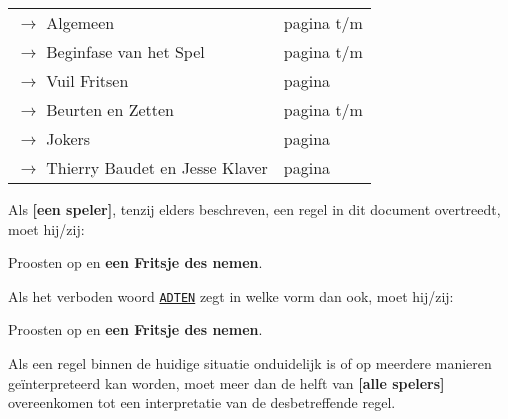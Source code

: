 \newpage
\drawBar{}


\begin{tabular}{ll}
    \large{$\rightarrow$ Algemeen} & \hspace{0.5cm} \large{pagina \pageref{sec:algemeen_start} t/m \pageref{sec:algemeen_einde}} \\
    \large{$\rightarrow$ Beginfase} van het Spel & \hspace{0.5cm} \large{pagina \pageref{sec:beginfase_start} t/m \pageref{sec:beginfase_einde}}\\
    \large{$\rightarrow$ Vuil Fritsen} & \hspace{0.5cm} \large{pagina \pageref{sec:vuil_fritsen}}\\
    \large{$\rightarrow$ Beurten en Zetten} & \hspace{0.5cm} \large{pagina \pageref{sec:beurten_en_zetten_start} t/m \pageref{sec:beurten_en_zetten_einde}} \\
    \large{$\rightarrow$ Jokers} & \hspace{0.5cm} \large{pagina \pageref{sec:jokers}}\\
    \large{$\rightarrow$ Thierry Baudet en Jesse Klaver} & \hspace{0.5cm} \large{pagina \pageref{sec:thierry}}
\end{tabular}

\label{sec:algemeen_start}
    \item Als \textbf{[een speler]}, tenzij elders beschreven, een regel in dit document overtreedt, moet hij/zij:
    \puntLijst{}
        \item Proosten op  en \textbf{een Fritsje des nemen}\footnotemark[1].
    \eindPuntLijst{}
\eindLijst{}  

\vervolgLijst{}
    \item Als \eenSpeler het verboden woord \ul{\texttt{ADTEN}} zegt in welke vorm dan ook, moet hij/zij:
    \puntLijst{}
    \item Proosten op  en \textbf{een Fritsje des nemen}\footnotemark[1]. 
    \eindPuntLijst{}
\eindLijst{}   

\vervolgLijst{}
    \item Als een regel binnen de huidige situatie onduidelijk is of op meerdere manieren geïnterpreteerd kan worden, moet meer dan de helft van \textbf{[alle spelers]} overeenkomen tot een interpretatie van de desbetreffende regel.
\eindLijst{}

